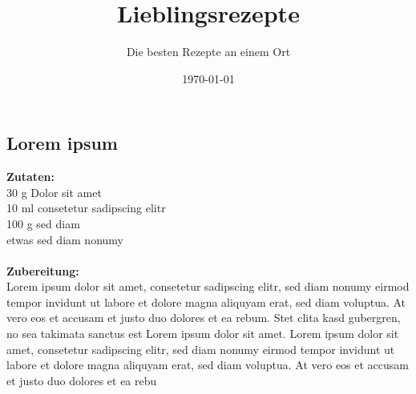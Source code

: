 \documentclass[8pt,twoside]{extarticle}
\title{\Huge  Lieblingsrezepte}
\author{\Large  Die besten Rezepte an einem Ort}
\date{\today}
\begin{document}
\maketitle

\thispagestyle{empty}
\newpage
\null\thispagestyle{empty}\newpage

\begin{multicols}{3}

\subsection{Lorem ipsum}
\textbf{Zutaten:} \\ 
30 g Dolor sit amet\\ 
10 ml consetetur sadipscing elitr\\ 
100 g sed diam\\ 
  etwas sed diam nonumy\\
\\ \textbf{Zubereitung:} \\ 
Lorem ipsum dolor sit amet, consetetur sadipscing elitr, sed diam nonumy eirmod tempor invidunt ut labore et dolore magna aliquyam erat, sed diam voluptua. At vero eos et accusam et justo duo dolores et ea rebum. Stet clita kasd gubergren, no sea takimata sanctus est Lorem ipsum dolor sit amet. Lorem ipsum dolor sit amet, consetetur sadipscing elitr, sed diam nonumy eirmod tempor invidunt ut labore et dolore magna aliquyam erat, sed diam voluptua. At vero eos et accusam et justo duo dolores et ea rebu

\end{multicols}
\tableofcontents
\end{document}
